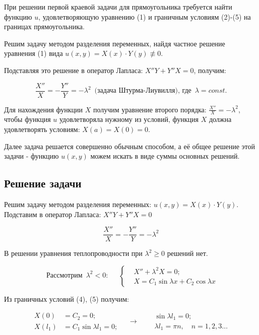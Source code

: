 \indent

При решении первой краевой задачи для прямоугольника требуется найти функцию $u$, удовлетворяющую уравнению (1) и граничным условиям (2)-(5) на границах прямоугольника.

Решим задачу методом разделения переменных, найдя частное решение уравнения (1) вида $u(x, y) = X(x)\cdot Y(y) \not\equiv 0$.

Подставляя это решение в оператор Лапласа: $X''Y + Y''X = 0$, получим:

$$\frac{X''}{X} = - \frac{Y''}{Y} = - \lambda^{2}\,\,\, \text{(задача Штурма-Лиувилля), где}\,\,\, \lambda = const.$$

Для нахождения функции $X$ получим уравнение второго порядка: $\frac{X''}{X} = -\lambda^{2}$, чтобы функция $u$ удовлетворяла нужному из условий, функция $X$ должна удовлетворять условиям: $X(a) = X(0) = 0$.

Далее задача решается совершенно обычным способом, а её общее решение этой задачи - функцию $u(x, y)$ можем искать в виде суммы основных решений.

\pagebreak

\subsection{Решение задачи}

\indent

Решим задачу методом разделения переменных: $u(x, y) = X(x) \cdot Y(y)$. Подставим в оператор Лапласа: $X''Y + Y''X = 0$

$$\frac{X''}{X} = -\frac{Y''}{Y} = -\lambda^{2}$$

В решении уравнения теплопроводности при $\lambda^{2} \geq 0$ решений нет.

\begin{equation*}
\begin{aligned}
\text{Рассмотрим}\,\,\, \lambda^{2} < 0: \\
\end{aligned}
\quad \left\{
\begin{aligned}
       & X'' + \lambda^{2}X = 0; \\
       & X = C_{1} \sin{\lambda x} + C_{2} \cos{\lambda x}
\end{aligned}
\right.
\end{equation*}  

Из граничных условий (4), (5) получим:

\begin{equation*}
  \begin{split}
    X(0) & = C_{2} = 0;\\
    X(l_{1}) & = C_{1} \sin{\lambda l_{1}} = 0;
  \end{split}
\quad\rightarrow\quad
  \begin{split}
    & \sin{\lambda l_{1}} = 0;\\
    & \lambda l_{1} = \pi n, \quad n=1,2,3\ldots
  \end{split}
\end{equation*}

